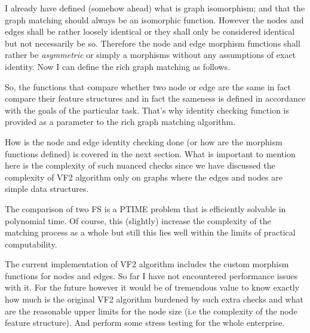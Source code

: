 I already have defined (somehow ahead) what is graph isomorphism; and that the graph matching should always be an isomorphic function. However the nodes and edges shall be rather loosely identical or they shall only be considered identical but not necessarily be so. Therefore the node and edge morphism functions shall rather be \textit{asymmetric} or simply a morphisms without any assumptions of exact identity. Now I can define the rich graph matching as follows.  



So, the functions that compare whether two node or edge are the same in fact compare their feature structures and in fact the sameness is defined in accordance with the goals of the particular task. That's why identity checking function is provided as a parameter to the rich graph matching algorithm.

How is the node and edge identity checking done (or how are the morphism functions defined) is covered in the next section. What is important to mention here is the complexity of such nuanced checks since we have discussed the complexity of VF2 algorithm only on graphs where the edges and nodes are simple data structures. 

The comparison of two FS is a PTIME problem that is efficiently solvable in polynomial time. Of course, this (slightly) increase the complexity of the matching process as a whole but still this lies well within the limits of practical computability. 

The current implementation of VF2 algorithm includes the custom morphism functions for nodes and edges. So far I have not encountered performance issues with it. For the future however it would be of tremendous value to know exactly how much is the original VF2 algorithm burdened by such extra checks and what are the reasonable upper limits for the node size (i.e the complexity of the node feature structure). And perform some stress testing for the whole enterprise.  


